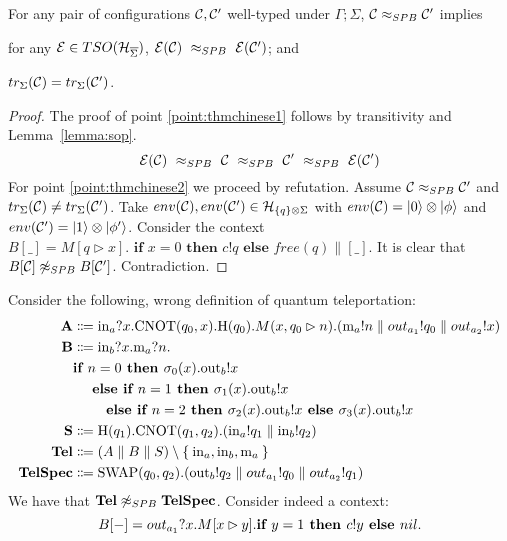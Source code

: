 \begin{theorem}
	For any pair of configurations $\mathcal{C}, \mathcal{C}'$ well-typed under $\Gamma; \Sigma$, 
	$\mathcal{C} \approx_{SPB} \mathcal{C}'$ implies
	\begin{enumerate}
		{\item for any $\mathcal{E} \in TSO(\mathcal{H}_{\overline{\Sigma}})$, $\mathcal{E} (\mathcal{C})\ \approx_{SPB}\ \mathcal{E} (\mathcal{C}')$; and \label{point:thmchinese1}}
		{\item $tr_{\Sigma}(\mathcal{C}) = tr_{\Sigma}(\mathcal{C}')$. \label{point:thmchinese2}}
	\end{enumerate}
\end{theorem}
\begin{proof}
	The proof of point \ref{point:thmchinese1} follows by transitivity and Lemma~\ref{lemma:sop}.
	\[
	 \sop (\conf)\ \approx_{SPB}\ \conf\ \approx_{SPB}\ \conf'\ \approx_{SPB}\ \sop (\conf') 
	\]
	For point \ref{point:thmchinese2} we proceed by refutation.
	Assume $\mathcal{C} \approx_{SPB} \mathcal{C}'$ and $tr_{\Sigma}(\mathcal{C}) \neq tr_{\Sigma}(\mathcal{C}')$.
	Take $env(\mathcal{C}), env(\mathcal{C}') \in \mathcal{H}_{\{ q \} \otimes \Sigma}$ with $env(\mathcal{C}) = \ket{0} \otimes \ket{\phi}$ and $env(\mathcal{C}') = \ket{1} \otimes \ket{\phi'}$.
	Consider the context $B[\_] = M[q \triangleright x] . \textbf{ if } x = 0 \textbf{ then } c!q \textbf{ else } free(q) \parallel [\_]$.
	It is clear that $B[\mathcal{C}] \not\approx_{SPB} B[\mathcal{C}']$. Contradiction.
\end{proof}

\begin{example}
	Consider the following, wrong definition of quantum teleportation:
	\begin{align*}
		\text{\textbf{A}} &\Coloneqq \text{in}_a?x.\text{CNOT}(q_0, x).\text{H}(q_0).M(x,q_0 \rhd n).(\text{m}_a!n \parallel out_{a_1}! q_0 \parallel out_{a_2}! x )\\
    \text{\textbf{B}} &\Coloneqq \text{in}_b?x.\text{m}_a?n.
       \\ & \textbf{if } n = 0 \textbf{ then } \sigma_0(x).\text{out}_b!x\\&\quad \textbf{ else } \textbf{if } n = 1 \textbf{ then } \sigma_1(x).\text{out}_b!x\\&\qquad \textbf{ else } \textbf{if } n = 2 \textbf{ then } \sigma_2(x).\text{out}_b!x \textbf{ else } \sigma_3(x).\text{out}_b!x
      \\
		\text{\textbf{S}} &\Coloneqq \text{H}(q_1).\text{CNOT}(q_1, q_2).(\text{in}_a!q_1 \parallel \text{in}_b!q_2) \\
		\text{\textbf{Tel}} &\Coloneqq (A \parallel B \parallel S) \setminus \Set{\text{in}_a, \text{in}_b, \text{m}_a } \\
		\text{\textbf{TelSpec}} &\Coloneqq \text{SWAP}(q_0,q_2).(\text{out}_b!q_2 \parallel out_{a_1}! q_0 \parallel out_{a_2}! q_1)
	\end{align*}
	We have that $\text{\textbf{Tel}} \not\approx_{SPB} \text{\textbf{TelSpec}}$.
	Consider indeed a context:
  \[ B[{-}] = out_{a_1} ? x . M[x \rhd y] . \textbf{if } y = 1 \textbf{ then } c!y \textbf{ else } nil. \]
\end{example}


